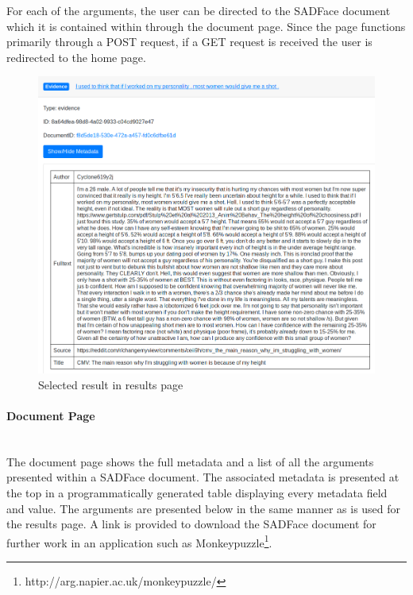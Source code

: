 \documentclass[12pt,a4paper]{article}
\begin{document}
For each of the arguments, the user can be directed to the SADFace document which it is contained within through the document page. Since the page functions primarily through a POST request, if a GET request is received the user is redirected to the home page.

\begin{figure}[H]
    \centering
    \includegraphics[scale=0.4]{Report/graphics/results-2.png}
    \caption{Selected result in results page}
    \label{fig:results2}
\end{figure}


\paragraph{Document Page}\mbox{}\\

The document page shows the full metadata and a list of all the arguments presented within a SADFace document. The associated metadata is presented at the top in a programmatically generated table displaying every metadata field and value. The arguments are presented below in the same manner as is used for the results page. A link is provided to download the SADFace document for further work in an application such as Monkeypuzzle\footnote{http://arg.napier.ac.uk/monkeypuzzle/}.
\end{document}
